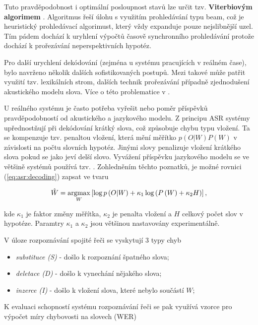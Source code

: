 \noindent Tuto pravděpodobnost i optimální posloupnost stavů lze určit tzv. \textbf{Viterbiovým algorimem} \cite{Holmes2001}. Algoritmus řeší úlohu s využitím prohledávání typu beam, což je heuristický prohledávací algorimust, který vždy expanduje pouze nejslibnější uzel. Tím pádem dochází k uryhlení výpočtů časově synchronního prohledávání protože dochází k prořezávání neperspektivních hypotéz.

Pro další urychlení dekódování (zejména u systému pracujících v reálném čase), bylo navrženo několik dalších sofistikovaných postupů. Mezi takové může patřit využití tzv. lexikálních strom, dalších technik prořezávání případně zjednodušení akustického modelu slova. Více o této problematice v \cite{Psutka2006}.

U reálného systému je často potřeba vyřešit nebo  poměr příspěvků pravděpodobností od akustického a jazykového modelu. Z principu ASR systémy upřednostňují při dekódování krátký slova, což způsobuje chybu typu vložení. Ta se kompenzuje tzv. penaltou vložení, která mění měřítko $p(O|W)P(W)$ v závislosti na počtu slovních hypotéz. Jinými slovy penalizuje vložení krátkého slova pokud se jako  jeví delší slovo. Vyvážení příspěvku jazykového modelu se ve většině systémů používá tzv. . Zohledněním těchto poznatků, je možné rovnici (\ref{eq:asr:decoding}) zapsat ve tvaru

\begin{equation}
  \hat{W} = \operatorname*{argmax}_{W} \left[\log p\left(O|W\right) + \kappa_1 \log\left(P\left(W\right) + \kappa_2H\right)\right],
  \label{eq:asr:decoding:compensated}
\end{equation}

\noindent kde $\kappa_1$ je faktor změny měřítka, $\kappa_2$ je penalta vložení a $H$ celkový počet slov v hypotéze. Paramtry $\kappa_1$ a $\kappa_2$ jsou většinou nastavovány experimentálně.

V úloze rozpoznávání spojité řeči se vyskytují 3 typy chyb

\begin{itemize}
  \item \textit{substituce (S)} - došlo k rozpoznání špatného slova;
  \item \textit{deletace (D)} - došlo k vynechání nějakého slova;
  \item \textit{inzerce (I)} - došlo k vložení slova, které nebylo součástí $W$;
\end{itemize}

\noindent K evaluaci schopností systému rozpoznávání řeči se pak využívá vzorce pro výpočet míry chybovosti na slovech (WER)

